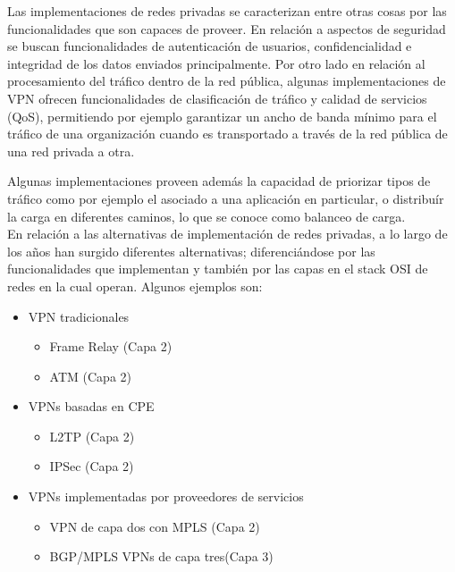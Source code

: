 Las implementaciones de redes privadas se caracterizan entre otras cosas por las funcionalidades que son capaces de proveer. En relaci\'on a aspectos de seguridad se buscan funcionalidades de autenticaci\'on de usuarios, confidencialidad e integridad de los datos enviados principalmente. Por otro lado en relaci\'on al procesamiento del tr\'afico dentro de la red p\'ublica, algunas implementaciones de VPN ofrecen funcionalidades de clasificaci\'on de tr\'afico y calidad de servicios (QoS), permitiendo por ejemplo garantizar un ancho de banda m\'inimo para el tr\'afico de una organizaci\'on cuando es transportado a trav\'es de la red p\'ublica de una red privada a otra. 

Algunas implementaciones proveen adem\'as la capacidad de priorizar tipos de tr\'afico como por ejemplo el asociado a una aplicaci\'on en particular, o distribu\'ir la carga en diferentes caminos, lo que se conoce como balanceo de carga.\\


En relaci\'on a las alternativas de implementaci\'on de redes privadas, a lo largo de los años han surgido diferentes alternativas; diferenciándose por las funcionalidades que implementan y tambi\'en por las capas en el stack OSI de redes en la cual operan. Algunos ejemplos son: 

\begin{itemize}
\item VPN tradicionales
	\begin{itemize}
	\item Frame Relay (Capa 2)	
	\item ATM (Capa 2)
	\end{itemize}
	
\item VPNs basadas en CPE
	\begin{itemize}
	\item L2TP (Capa 2)
	\item IPSec (Capa 2)
	\end{itemize}
	
\item VPNs implementadas por proveedores de servicios
	\begin{itemize}
	\item VPN de capa dos con MPLS (Capa 2)
	\item BGP/MPLS VPNs de capa tres(Capa 3)
	\end{itemize}
\end{itemize}

